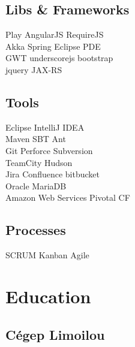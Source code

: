 \documentclass[letterpaper]{deedy-resume} %
\begin{document}
\begin{minipage}[t]{0.33\textwidth}
\subsection{Libs \& Frameworks}

Play \textbullet{} AngularJS \textbullet{} RequireJS \\
Akka \textbullet{} Spring \textbullet{} Eclipse PDE \\
GWT \textbullet{} underscorejs \textbullet{} bootstrap \\
jquery \textbullet{} JAX-RS

\sectionspace %

\subsection{Tools}

Eclipse \textbullet{} IntelliJ IDEA \\
Maven \textbullet{} SBT \textbullet{} Ant \\
Git \textbullet{} Perforce \textbullet{} Subversion \\
TeamCity \textbullet{} Hudson \\
Jira \textbullet{} Confluence \textbullet{} bitbucket \\
Oracle \textbullet{} MariaDB \\
Amazon Web Services \textbullet{} Pivotal CF

\sectionspace %

\subsection{Processes}
SCRUM \textbullet{} Kanban \textbullet{} Agile

\sectionspace %


\section{Education} 

\subsection{Cégep Limoilou}



\end{minipage}
\end{document}
